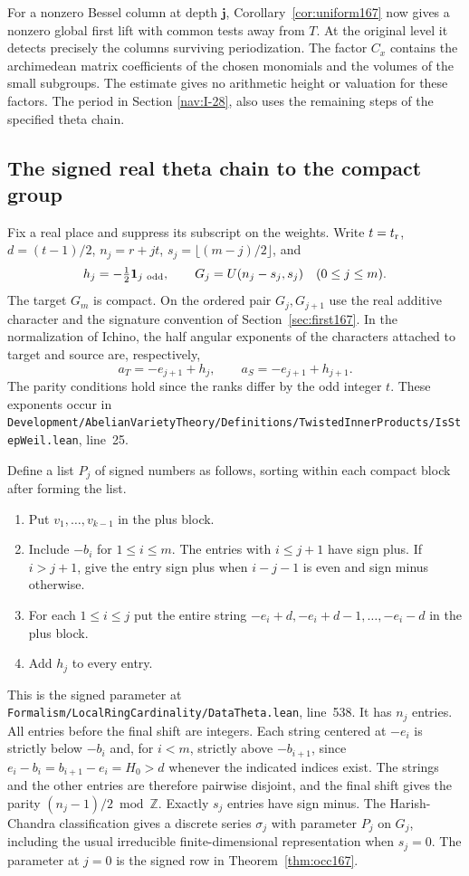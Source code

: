 \documentclass[a4paper,11pt]{article}
\theoremstyle{definition}
\theoremstyle{remark}
\newcommand{\ZZ}{\mathbb Z}\newcommand{\ord}{\operatorname{ord}}
\newcommand{\srcloc}[2]{{\small\nolinkurl{#1.lean}}, line~#2}
\numberwithin{equation}{section}
\begin{document}
For a nonzero Bessel column at depth \(\boldsymbol j\),
Corollary~\ref{cor:uniform167} now gives a nonzero global
first lift with common tests away from \(T\). At the original
level it detects precisely the columns surviving periodization.
The factor \(C_x\) contains the archimedean matrix coefficients
of the chosen monomials and the volumes of the small subgroups.
The estimate gives no arithmetic height or valuation for these
factors. The period in Section \ref{nav:I-28}, also uses the
remaining steps of the specified theta chain.

\subsection{The signed real theta chain to the compact group}\label{nav:VIII-02}
\label{sec:realtower169}

Fix a real place and suppress its subscript on the weights.
Write \(t=t_{\rm r}\), \(d=(t-1)/2\),
\(n_j=r+jt\), \(s_j=\lfloor(m-j)/2\rfloor\), and
\[
          h_j=-\tfrac12\mathbf1_{j\ {\rm odd}},\qquad
          G_j=U(n_j-s_j,s_j) \quad(0\le j\le m).
\]
The target \(G_m\) is compact. On the ordered pair
\(G_j,G_{j+1}\) use the real additive character and the
signature convention of Section~\ref{sec:first167}. In the
normalization of Ichino, the half angular exponents of the
characters attached to target and source are, respectively,
\[
            a_T=-e_{j+1}+h_j,\qquad
            a_S=-e_{j+1}+h_{j+1}.
\]
The parity conditions hold since the ranks differ by the odd
integer \(t\). These exponents occur in
\srcloc{Development/AbelianVarietyTheory/Definitions/TwistedInnerProducts/IsStepWeil}{25}.

Define a list \(P_j\) of signed numbers as follows, sorting
within each compact block after forming the list.
\begin{enumerate}
\item Put \(v_1,\ldots,v_{k-1}\) in the plus block.
\item Include \(-b_i\) for \(1\le i\le m\). The entries with
 \(i\le j+1\) have sign plus. If \(i>j+1\), give the entry
 sign plus when \(i-j-1\) is even and sign minus otherwise.
\item For each \(1\le i\le j\) put the entire string
 \(-e_i+d,-e_i+d-1,\ldots,-e_i-d\) in the plus block.
\item Add \(h_j\) to every entry.
\end{enumerate}
This is the signed parameter at
\srcloc{Formalism/LocalRingCardinality/DataTheta}{538}.
It has \(n_j\) entries. All entries before the final shift are
integers. Each string centered at \(-e_i\) is strictly below
\(-b_i\) and, for \(i<m\), strictly above \(-b_{i+1}\), since
\(e_i-b_i=b_{i+1}-e_i=H_0>d\) whenever the indicated
indices exist. The strings and the other entries are therefore
pairwise disjoint, and the final shift gives the parity
\((n_j-1)/2\bmod\ZZ\). Exactly \(s_j\) entries have sign
minus. The Harish-Chandra classification gives a discrete
series \(\sigma_j\) with parameter \(P_j\) on \(G_j\), including
the usual irreducible finite-dimensional representation when
\(s_j=0\). The parameter at \(j=0\) is the signed row in
Theorem~\ref{thm:occ167}.
\end{document}
